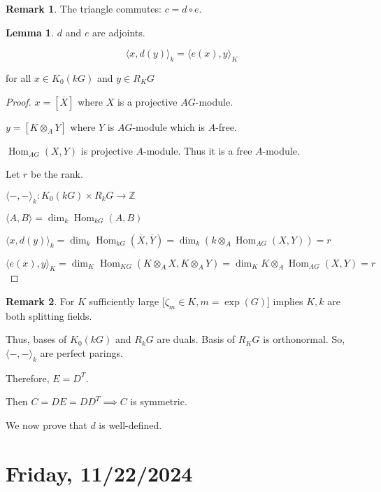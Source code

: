 \documentclass{article}
\theoremstyle{definition}
\newtheorem{lemma}[theorem]{Lemma}
\newtheorem*{remark}{Remark}
\begin{document}
\begin{remark}
    The triangle commutes: \(c = d \circ e\).
\end{remark}

\begin{lemma}
    \(d\) and \(e\) are adjoints.

    \[
        \langle x, d(y) \rangle_k = \langle e(x), y \rangle_K
    \]

    for all \(x \in K_0(kG)\) and \(y\in R_K G\)
\end{lemma}

\begin{proof}
    \(x = [\overline{X}]\) where \(X\) is a projective \(AG\)-module.

    \(y = [K \otimes_A Y]\) where \(Y\) is \(AG\)-module which is \(A\)-free.
    
    \(\operatorname{Hom}_{AG}(X,Y)\) is projective \(A\)-module. Thus it is a free \(A\)-module.
    
    Let \(r\) be the rank.

    \(\langle -,- \rangle_k : K_0(kG) \times R_k G \to \mathbb{Z}\)

    \(\langle A, B \rangle = \dim_k \operatorname{Hom}_{kG} (A,B)\)
    
    \(\langle x, d(y) \rangle_k = \dim_k \operatorname{Hom}_{kG} (\overline{X},\overline{Y}) = \dim_k (k \otimes_{A} \operatorname{Hom}_{AG} (X,Y)) = r\) 

    \(\langle e(x),y \rangle_K = \dim_K \operatorname{Hom}_{KG}(K \otimes_{A} X, K \otimes_{A} Y) = \dim_K K \otimes_{A} \operatorname{Hom}_{AG}(X,Y) = r\) 

\end{proof}

\begin{remark}
    For \(K\) sufficiently large [\(\zeta_m \in K, m = \exp(G)\)] implies \(K, k\) are both splitting fields.

    Thus, bases of \(K_0(kG)\) and \(R_k G\) are duals. Basis of \(R_K G\) is orthonormal. So, \(\langle -,- \rangle_k\) are perfect parings.
    
    Therefore, \(E = D^T\).

    Then \(C = DE = D D^T \implies C\) is symmetric.
    
\end{remark}

We now prove that \(d\) is well-defined.

\section*{Friday, 11/22/2024}
\end{document}
